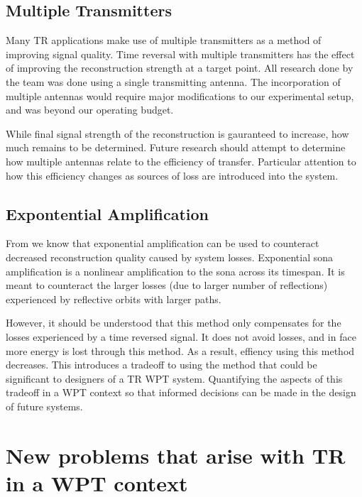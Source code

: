 \subsection{Multiple Transmitters}

Many TR applications make use of multiple transmitters as a method of improving signal quality. Time reversal with multiple transmitters has the effect of improving the reconstruction strength at a target point.  All research done by the team was done using a single transmitting antenna. The incorporation of multiple antennas would require major modifications to our experimental setup, and was beyond our operating budget.

While final signal strength of the reconstruction is gauranteed to increase, how much remains to be determined. Future research should attempt to determine how multiple antennas relate to the efficiency of transfer. Particular attention to how this efficiency changes as sources of loss are introduced into the system.

\subsection{Expontential Amplification}

From \cite{Biniyam} we know that exponential amplification can be used to counteract decreased reconstruction quality caused by system losses. Exponential sona amplification is a nonlinear amplification to the sona across its timespan. It is meant to counteract the larger losses (due to larger number of reflections) experienced by reflective orbits with larger paths.

However, it should be understood that this method only compensates for the losses experienced by a time reversed signal. It does not avoid losses, and in face more energy is lost through this method. As a result, effiency using this method decreases. This introduces a tradeoff to using the method that could be significant to designers of a TR WPT system. Quantifying the aspects of this tradeoff in a WPT context so that informed decisions can be made in the design of future systems.

\section{New problems that arise with TR in a WPT context}
\label{sec:future-wpt}


